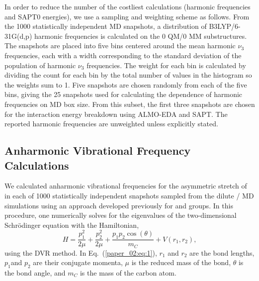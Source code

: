 \documentclass[%
  class = book,%
  crop = false,%
  float = true,%
  multi = true,%
  preview = false,%
]{standalone}
\let\cite\autocite
\begin{document}
In order to reduce the number of the costliest calculations (harmonic frequencies and SAPT0 energies), we use a sampling and weighting scheme as follows. From the \num{1000} statistically independent MD snapshots, a distribution of B3LYP/6-31G(d,p) harmonic frequencies is calculated on the 0 QM/0 MM substructures. The snapshots are placed into five bins centered around the mean harmonic \(\nu_{3}\) frequencies, each with a width corresponding to the standard deviation of the population of harmonic \(\nu_{3}\) frequencies. The weight for each bin is calculated by dividing the count for each bin by the total number of values in the histogram so the weights sum to \num{1}. Five snapshots are chosen randomly from each of the five bins, giving the \num{25} snapshots used for calculating the dependence of harmonic frequencies on MD box size. From this subset, the first three snapshots are chosen for the interaction energy breakdown using ALMO-EDA and SAPT. The reported harmonic frequencies are unweighted unless explicitly stated.

\subsection{Anharmonic Vibrational Frequency Calculations}
\label{paper_02:ssec:IIB}

We calculated anharmonic vibrational frequencies for the asymmetric stretch of  in each of \num{1000} statistically independent snapshots sampled from the dilute /\ce{[C4C1im][PF6]} MD simulations using an approach developed previously for  and  groups.\cite{levinson_phosphate_2011,Kinnaman2006} In this procedure, one numerically solves for the eigenvalues of the two-dimensional Schr{\"{o}}dinger equation with the Hamiltonian,
\begin{equation}
  \label{paper_02:eq:1}
H = \frac{p_{1}^{2}}{2\mu} + \frac{p_{2}^{2}}{2\mu} + \frac{p_{1}p_{2}\cos{(\theta)}}{m_{C}} + V\left( r_{1},r_{2} \right),
\end{equation}
using the DVR method.\cite{colbert_novel_1992,seideman_quantum_1992} In Eq.~(\ref{paper_02:eq:1}), \(r_{1}\) and \(r_{2}\) are the  bond lengths, \(p_{1}\)and \(p_{2}\) are their conjugate momenta, \(\mu\) is the reduced mass of the  bond, \(\theta\) is the  bond angle, and \(m_C\) is the mass of the carbon atom.
\end{document}

